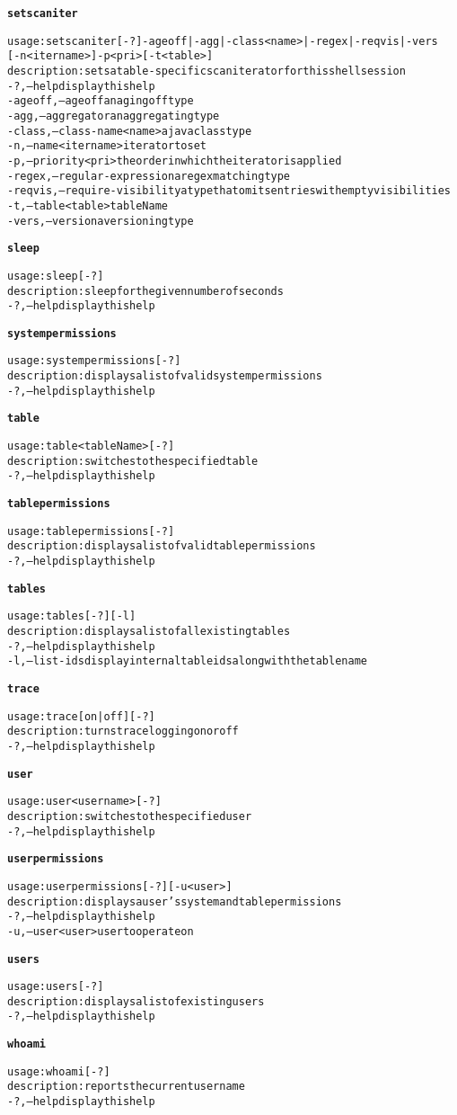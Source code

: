 \begin{alltt}
\textbf{setscaniter}

    usage: setscaniter [-?] -ageoff | -agg | -class <name> | -regex | -reqvis | -vers
    	       [-n <itername>] -p <pri>  [-t <table>]
    description: sets a table-specific scan iterator for this shell session
      -?,--help  display this help
      -ageoff,--ageoff  an aging off type
      -agg,--aggregator  an aggregating type
      -class,--class-name <name>  a java class type
      -n,--name <itername>	iterator to set
      -p,--priority <pri>  the order in which the iterator is applied
      -regex,--regular-expression  a regex matching type
      -reqvis,--require-visibility	a type that omits entries with empty visibilities
      -t,--table <table>  tableName
      -vers,--version  a versioning type

\textbf{sleep}

    usage: sleep [-?]
    description: sleep for the given number of seconds
      -?,--help  display this help

\textbf{systempermissions}

    usage: systempermissions [-?]
    description: displays a list of valid system permissions
      -?,--help  display this help

\textbf{table}

    usage: table <tableName> [-?]
    description: switches to the specified table
      -?,--help  display this help

\textbf{tablepermissions}

    usage: tablepermissions [-?]
    description: displays a list of valid table permissions
      -?,--help  display this help

\textbf{tables}

    usage: tables [-?] [-l]
    description: displays a list of all existing tables
      -?,--help  display this help
      -l,--list-ids  display internal table ids along with the table name

\textbf{trace}

    usage: trace [ on | off ] [-?]
    description: turns trace logging on or off
      -?,--help  display this help

\textbf{user}

    usage: user <username> [-?]
    description: switches to the specified user
      -?,--help  display this help

\textbf{userpermissions}

    usage: userpermissions [-?] [-u <user>]
    description: displays a user's system and table permissions
      -?,--help  display this help
      -u,--user <user>  user to operate on

\textbf{users}

    usage: users [-?]
    description: displays a list of existing users
      -?,--help  display this help

\textbf{whoami}

    usage: whoami [-?]
    description: reports the current user name
      -?,--help  display this help


\end{alltt}
